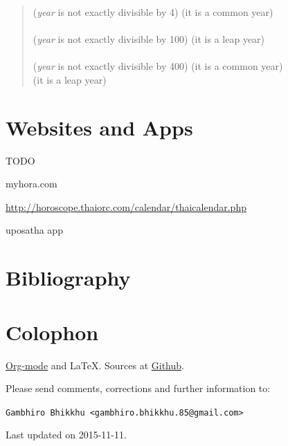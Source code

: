 \documentclass[11pt,oneside]{memoir-article}
\begin{document}
\begin{quote}
 (\emph{year} is not exactly divisible by 4)  (it is a common year)\\
\\
 (\emph{year} is not exactly divisible by 100)  (it is a leap year)\\
\\
 (\emph{year} is not exactly divisible by 400)  (it is a common year)\\
 (it is a leap year)
\cite{wp-leap-year}
\end{quote}

\backmatter

\chapter{Websites and Apps}
\label{sec-7}

TODO

myhora.com

\url{http://horoscope.thaiorc.com/calendar/thaicalendar.php}

uposatha app

\chapter{Bibliography}
\label{sec-8}
\label{bibliography}




\chapter{Colophon}
\label{sec-9}

\href{http://orgmode.org/}{Org-mode} and \LaTeX. Sources at \href{https://github.com/profound-labs/calculating-the-uposatha-moondays/}{Github}.

Please send comments, corrections and further information to:

\texttt{Gambhiro Bhikkhu <gambhiro.bhikkhu.85@gmail.com>}

Last updated on 2015-11-11.





\end{document}
